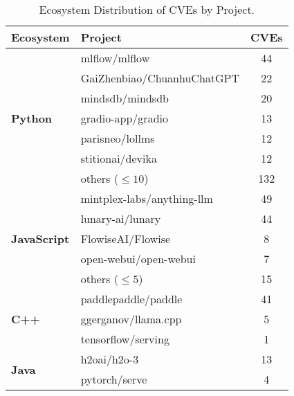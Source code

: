 \begin{table}[t]
\centering
\caption{Ecosystem Distribution of CVEs by Project.}
\label{tab:ecosystem_components_desc}
\begin{tabular}{llc}
\toprule
\textbf{Ecosystem}      & \textbf{Project}                            & \textbf{CVEs} \\
\midrule
\multirow{7}{*}{\textbf{Python}} & mlflow/mlflow                               & 44            \\
                         & GaiZhenbiao/ChuanhuChatGPT                  & 22            \\
                         & mindsdb/mindsdb                              & 20            \\
                         & gradio-app/gradio                          & 13            \\
                         & parisneo/lollms                            & 12            \\
                         & stitionai/devika                           & 12            \\
                         & others ($\le 10$)                              & 132           \\
\midrule
\multirow{5}{*}{\textbf{JavaScript}} 
                         & mintplex-labs/anything-llm                 & 49            \\
                         & lunary-ai/lunary                           & 44            \\
                         & FlowiseAI/Flowise
                         & 8        \\
                         & open-webui/open-webui                      & 7             \\
                         & others ($\le 5$)                           & 15            \\
\midrule
\multirow{3}{*}{\textbf{C++}}        & paddlepaddle/paddle                        & 41            \\
                             & ggerganov/llama.cpp                        & 5             \\
                             & tensorflow/serving                         & 1             \\
\midrule
\multirow{4}{*}{\textbf{Java}}      & h2oai/h2o-3                                & 13            \\
                             & pytorch/serve                              & 4             \\

\end{tabular}
\end{table}
